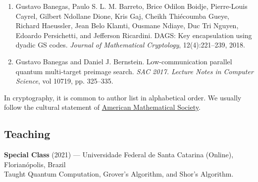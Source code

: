 \begin{enumerate}
\item Gustavo Banegas, Paulo S. L. M. Barreto, Brice Odilon Boidje, Pierre-Louis Cayrel, Gilbert Ndollane Dione, Kris Gaj, Cheikh Thiécoumba Gueye, Richard Haeussler, Jean Belo Klamti, Ousmane Ndiaye, Duc Tri Nguyen, Edoardo Persichetti, and Jefferson Ricardini. DAGS: Key encapsulation using dyadic GS codes. \textit{Journal of Mathematical Cryptology}, 12(4):221–239, 2018.
\item Gustavo Banegas and Daniel J. Bernstein. Low-communication parallel quantum multi-target preimage search. \textit{SAC 2017. Lecture Notes in Computer Science}, vol 10719, pp. 325–335.
\end{enumerate}
In cryptography, it is common to author list in alphabetical order. We usually follow the cultural statement of \href{https://www.ams.org/profession/leaders/CultureStatement04.pdf}{American Mathematical Society}. 

\subsection*{Teaching}
\noindent
\textbf{Special Class} (2021) — Universidade Federal de Santa Catarina (Online), Florianópolis, Brazil~\\
Taught Quantum Computation, Grover's Algorithm, and Shor's Algorithm. ~\\

